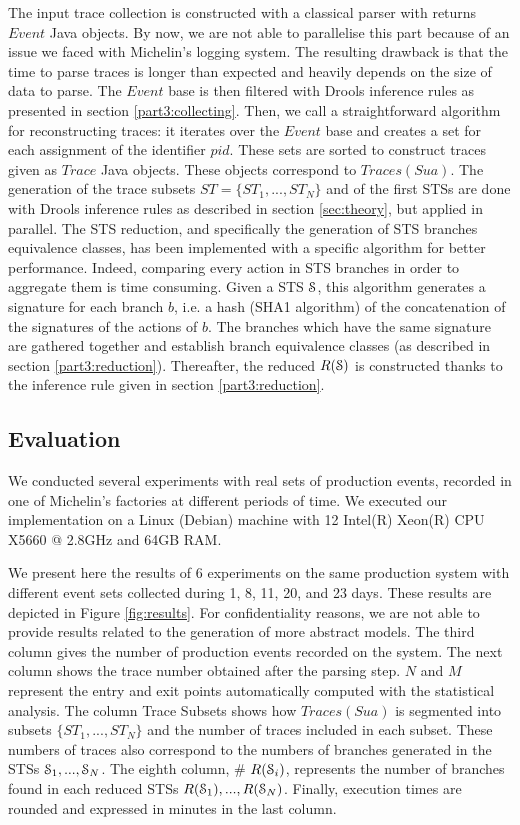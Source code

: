 The input trace collection is constructed with a classical parser
with returns $Event$ Java objects. By now, we are not able to
parallelise this part because of an issue we faced with
Michelin's logging system. The resulting drawback is that the
time to parse traces is longer than expected and heavily depends
on the size of data to parse. The $Event$ base is then filtered
with Drools inference rules as presented in section
\ref{part3:collecting}.  Then, we call a straightforward
algorithm for reconstructing traces: it iterates over the $Event$
base and creates a set for each assignment of the identifier
$pid$. These sets are sorted to construct traces given as $Trace$
Java objects. These objects correspond to $Traces(Sua)$. The
generation of the trace subsets $ST= \{ST_1,...,ST_N\}$ and of
the first STSs are done with Drools inference rules as described
in section \ref{sec:theory}, but applied in parallel. The STS
reduction, and specifically the generation of STS branches
equivalence classes, has been implemented with a specific
algorithm for better performance. Indeed, comparing every action
in STS branches in order to aggregate them is time consuming.
Given a STS $\EuScript{S}$, this algorithm generates a signature
for each branch $b$, i.e. a hash (SHA1 algorithm) of the
concatenation of the signatures of the actions of $b$. The
branches which have the same signature are gathered together and
establish branch equivalence classes (as described in section
\ref{part3:reduction}). Thereafter, the reduced $R(\EuScript{S})$
is constructed thanks to the inference rule given in section
\ref{part3:reduction}.

\subsection{Evaluation}

We conducted several experiments with real sets of production
events, recorded in one of Michelin's factories at different
periods of time. We executed our implementation on a Linux
(Debian) machine with 12 Intel(R) Xeon(R) CPU X5660 @ 2.8GHz and
64GB RAM.

We present here the results of 6 experiments on the same
production system with different event sets collected during 1,
8, 11, 20, and 23 days. These results are depicted in Figure
\ref{fig:results}. For confidentiality reasons, we are not able
to provide results related to the generation of more abstract
models. The third column gives the number of production events
recorded on the system. The next column shows the trace number
obtained after the parsing step.  $N$ and $M$ represent the entry
and exit points automatically computed with the statistical
analysis. The column Trace Subsets shows how $Traces(Sua)$ is
segmented into subsets $\{ST_1,...,ST_N\}$ and the number of
traces included in each subset. These numbers of traces also
correspond to the numbers of branches generated in the STSs
$\EuScript{S}_1,...,\EuScript{S}_N$. The eighth column, \#
$R(\EuScript{S}_i)$, represents the number of branches found in
each reduced STSs $R(\EuScript{S}_1),...,R(\EuScript{S}_N)$.
Finally, execution times are rounded and expressed in minutes in
the last column.

